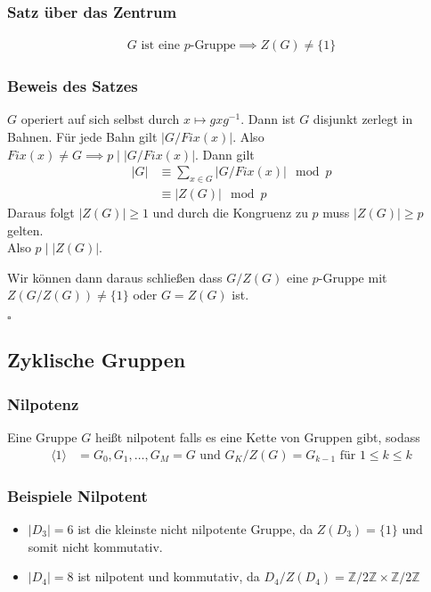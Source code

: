 \documentclass[12pt, german]{article}
\newcommand{\bewiesen}{

\begin{flushright}
		$\square$  \\
\end{flushright}}
\begin{document}
\subsubsection{Satz über das Zentrum}
	\begin{align*}
		G \text{ ist eine $p$-Gruppe} \implies Z(G) \not = \{1\}
	\end{align*}

\subsubsection{Beweis des Satzes}
	$G$ operiert auf sich selbst durch $x \mapsto gxg^{-1}$. Dann ist $G$ disjunkt zerlegt in Bahnen. Für jede Bahn gilt $|G/Fix(x)|$. 
	Also $Fix(x) \not= G \implies p \mid |G/Fix(x)|$. Dann gilt 
	\begin{align*}
		|G| &\equiv \sum_{x \in G} |G/Fix(x)|  \mod p\\
		&\equiv |Z(G) |\mod p
	\end{align*}
	Daraus folgt $|Z(G)| \geq 1$ und durch die Kongruenz zu $p$ muss $|Z(G)|\geq p$ gelten. \\
	Also $p \mid |Z(G)|$. 
	\newline
	
	Wir können dann daraus schließen dass $G/Z(G)$ eine $p$-Gruppe mit $Z(G/Z(G)) \not = \{1\}$ oder $G=Z(G)$ ist.
	\bewiesen
	
\subsection{Zyklische Gruppen}
\subsubsection{Nilpotenz}
	Eine Gruppe $G$ heißt nilpotent falls es eine Kette von Gruppen gibt, sodass
	\begin{align*}
		\langle 1 \rangle &= G_0, G_1, \ldots, G_M = G  \text{ und } G_K/Z(G) = G_{k-1} \text{ für } 1 \leq k \leq k
	\end{align*}

\subsubsection{Beispiele Nilpotent}
	\begin{itemize}
		\item $|D_3| = 6$ ist die kleinste nicht nilpotente Gruppe, da $Z(D_3) = \{1\}$ und somit nicht kommutativ.
		\item $|D_4| = 8$ ist nilpotent und kommutativ, da $D_4/Z(D_4) = \mathbb Z/2 \mathbb Z \times \mathbb Z /2\mathbb Z$
	\end{itemize}
\end{document}
